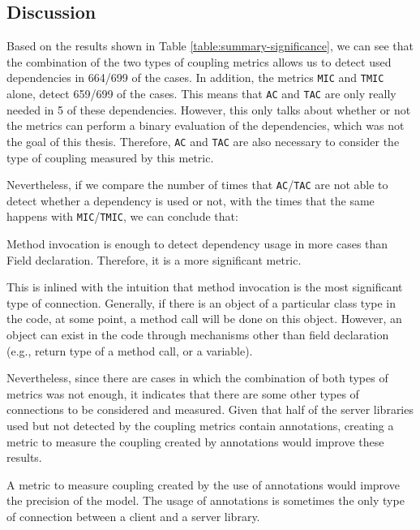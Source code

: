 \subsection{Discussion}

Based on the results shown in Table \ref{table:summary-significance}, we can see that the combination of the two types of coupling metrics allows us to detect used dependencies in 664/699 of the cases. In addition, the metrics \texttt{MIC} and \texttt{TMIC} alone, detect 659/699 of the cases. This means that \texttt{AC} and \texttt{TAC} are only really needed in 5 of these dependencies. However, this only talks about whether or not the metrics can perform a binary evaluation of the dependencies, which was not the goal of this thesis. Therefore, \texttt{AC} and \texttt{TAC} are also necessary to consider the type of coupling measured by this metric.

Nevertheless, if we compare the number of times that \texttt{AC}/\texttt{TAC} are not able to detect whether a dependency is used or not, with the times that the same happens with \texttt{MIC}/\texttt{TMIC}, we can conclude that:

\begin{finding}
	Method invocation is enough to detect dependency usage in more cases than Field declaration. Therefore, it is a more significant metric.
	\label{find:significance-mic}
\end{finding}

This is inlined with the intuition that method invocation is the most significant type of connection. Generally, if there is an object of a particular class type in the code, at some point, a method call will be done on this object. However, an object can exist in the code through mechanisms other than field declaration (e.g., return type of a method call, or a variable).

Nevertheless, since there are cases in which the combination of both types of metrics was not enough, it indicates that there are some other types of connections to be considered and measured. Given that half of the server libraries used but not detected by the coupling metrics contain annotations, creating a metric to measure the coupling created by annotations would improve these results.

\begin{finding}
	A metric to measure coupling created by the use of annotations would improve the precision of the model. The usage of annotations is sometimes the only type of connection between a client and a server library.
	\label{find:significance-annotations}
\end{finding}

